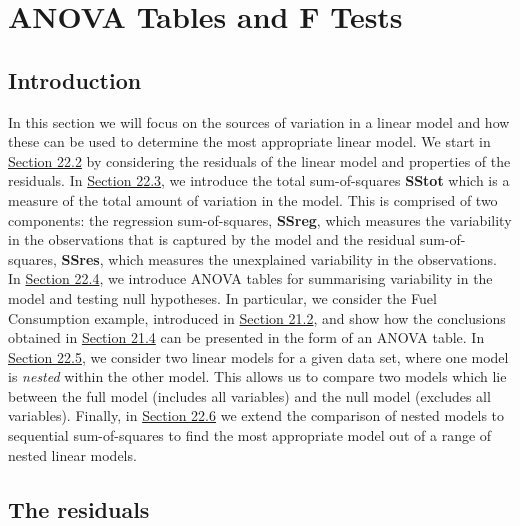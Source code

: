 \documentclass[
]{book}
\begin{document}
\hypertarget{Sec_Linear_ANOVA}{%
\chapter{ANOVA Tables and F Tests}\label{Sec_Linear_ANOVA}}

\hypertarget{Sec_Linear_ANOVA:Intro}{%
\section{Introduction}\label{Sec_Linear_ANOVA:Intro}}

In this section we will focus on the sources of variation in a linear model and how these can be used to determine the most appropriate linear model. We start in \protect\hyperlink{Sec_Linear_ANOVA:residuals}{Section 22.2} by considering the residuals of the linear model and properties of the residuals. In \protect\hyperlink{Sec_Linear_ANOVA:SS}{Section 22.3}, we introduce the total sum-of-squares {\textbf{SStot}} which is a measure of the total amount of variation in the model. This is comprised of two components: the regression sum-of-squares, {\textbf{SSreg}}, which measures the variability in the observations that is captured by the model and the residual sum-of-squares, {\textbf{SSres}}, which measures the unexplained variability in the observations. In \protect\hyperlink{Sec_Linear_ANOVA:ANOVA}{Section 22.4}, we introduce ANOVA tables for summarising variability in the model and testing null hypotheses. In particular, we consider the Fuel Consumption example, introduced in \protect\hyperlink{Sec_Linear_hypo_test:single}{Section 21.2}, and show how the conclusions obtained in \protect\hyperlink{Sec_Linear_hypo_test:F}{Section 21.4} can be presented in the form of an ANOVA table.
In \protect\hyperlink{Sec_Linear_ANOVA:Compare}{Section 22.5}, we consider two linear models for a given data set, where one model is \emph{nested} within the other model. This allows us to compare two models which lie between the full model (includes all variables) and the null model (excludes all variables). Finally, in \protect\hyperlink{Sec_Linear_ANOVA:seq}{Section 22.6} we extend the comparison of nested models to sequential sum-of-squares to find the most appropriate model out of a range of nested linear models.

\hypertarget{Sec_Linear_ANOVA:residuals}{%
\section{The residuals}\label{Sec_Linear_ANOVA:residuals}}
\end{document}
